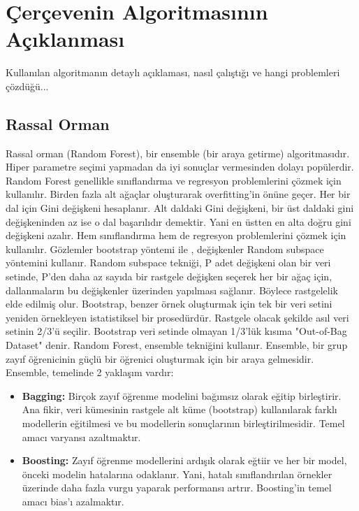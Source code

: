 \section{Çerçevenin Algoritmasının Açıklanması}
Kullanılan algoritmanın detaylı açıklaması, nasıl çalıştığı ve hangi problemleri çözdüğü...

\subsection{Rassal Orman}
Rassal orman (Random Forest), bir ensemble (bir araya getirme) algoritmasıdır. Hiper parametre seçimi yapmadan da iyi sonuçlar vermesinden dolayı popülerdir. Random Forest genellikle sınıflandırma ve regresyon problemlerini çözmek için kullanılır. Birden fazla alt ağaçlar oluşturarak overfitting'in önüne geçer. Her bir dal için Gini değişkeni hesaplanır. Alt daldaki Gini değişkeni, bir üst daldaki gini değişkeninden az ise o dal başarılıdır demektir. Yani en üstten en alta doğru gini değişkeni azalır. Hem sınıflandırma hem de regresyon problemlerini çözmek için kullanılır. Gözlemler bootstrap yöntemi ile , değişkenler Random subspace yöntemini kullanır. Random subspace tekniği, P adet değişkeni olan bir veri setinde, P'den daha az sayıda bir rastgele değişken seçerek her bir ağaç için, dallanmaların bu değişkenler üzerinden yapılması sağlanır. Böylece rastgelelik elde edilmiş olur. Bootstrap, benzer örnek oluşturmak için tek bir veri setini yeniden örnekleyen istatistiksel bir prosedürdür. Rastgele olacak şekilde asıl veri setinin 2/3'ü seçilir. Bootstrap veri setinde olmayan 1/3'lük kısıma "Out-of-Bag Dataset" denir. Random Forest, ensemble tekniğini kullanır. Ensemble, bir grup zayıf öğrenicinin güçlü bir öğrenici oluşturmak için bir araya gelmesidir. Ensemble, temelinde 2 yaklaşım vardır:
\begin{itemize}
\item \textbf{Bagging:} Birçok zayıf öğrenme modelini bağımsız olarak eğitip birleştirir. Ana fikir, veri kümesinin rastgele alt küme (bootstrap) kullanılarak farklı modellerin eğitilmesi ve bu modellerin sonuçlarının birleştirilmesidir. Temel amacı varyansı azaltmaktır.
\item \textbf{Boosting:} Zayıf öğrenme modellerini ardışık olarak eğtiir ve her bir model, önceki modelin hatalarına odaklanır. Yani, hatalı sınıflandırılan örnekler üzerinde daha fazla vurgu yaparak performansı artrır. Boosting'in temel amacı bias'ı azalmaktır.
\end{itemize}

